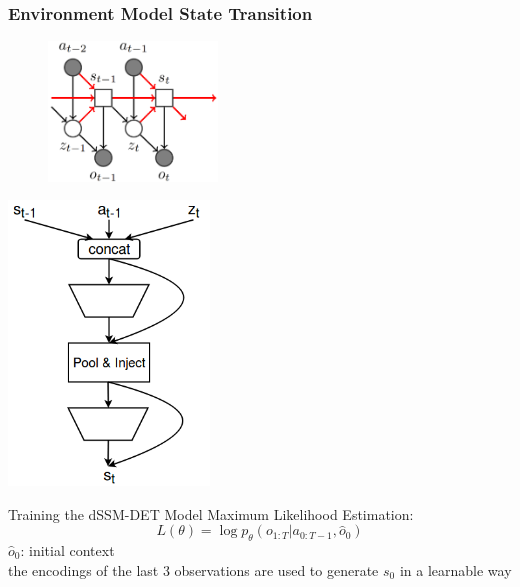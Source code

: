 \begin{frame}
	\frametitle{Environment Model State Transition}
	\begin{multicols}{2}
		\begin{figure}[h]
			\includegraphics[width=0.4\textwidth]{./latent_i2a_images/sSSM2_state_transition_marked.png}	
		\end{figure}
		\columnbreak
		\includegraphics[width=0.4\textwidth]{./latent_i2a_images/LatentSpaceTransition.png}
	\end{multicols}
\end{frame}


\begin{frame}{Training the dSSM-DET Model}
    Maximum Likelihood Estimation:
    \begin{equation}
            L(\theta) = \log p_{\theta}(o_{1:T}|a_{0:T-1}, \hat{o}_0)
    \end{equation}
        $\hat{o}_0$: initial context\\
        the encodings of the last 3 observations are used to generate $s_0$ in a learnable way
    
\end{frame}

